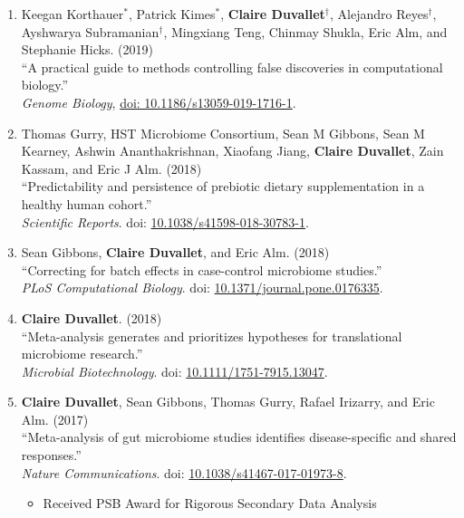 \documentclass[10pt]{article}
\makeatletter
\newlength{\bibhang}
\newlength{\bibsep}
 {\@listi \global\bibsep\itemsep \global\advance\bibsep by\parsep}
\newenvironment{bibsection}%
        {\begin{enumerate}{}{%
       \setlength{\leftmargin}{\bibhang}%
       \setlength{\itemindent}{-\leftmargin}%
       \setlength{\itemsep}{\bibsep}%
       \setlength{\parsep}{\z@}%
        \setlength{\partopsep}{0pt}%
        \setlength{\topsep}{0pt}}}
        {\end{enumerate}\vspace{-.6\baselineskip}}
\makeatother
\begin{document}
\begin{bibsection}
	\item Keegan Korthauer$^{*}$, Patrick Kimes$^{*}$, \textbf{Claire Duvallet}$^{\dagger}$,  Alejandro Reyes$^{\dagger}$,  Ayshwarya Subramanian$^{\dagger}$, Mingxiang Teng, Chinmay Shukla, Eric Alm, and Stephanie Hicks. (2019) \\
		``A practical guide to methods controlling false discoveries in computational biology.''  \\
		\textit{Genome Biology}, \href{https://doi.org/10.1186/s13059-019-1716-1}{doi: 10.1186/s13059-019-1716-1}.
		
	\item Thomas Gurry, HST Microbiome Consortium, Sean M Gibbons, Sean M Kearney, Ashwin Ananthakrishnan, Xiaofang Jiang, \textbf{Claire Duvallet}, Zain Kassam, and Eric J Alm. (2018) \\ 
		``Predictability and persistence of prebiotic dietary supplementation in a healthy human cohort.''  \\ 
		\emph{Scientific Reports}. doi: \href{https://doi.org/10.1038/s41598-018-30783-1}{10.1038/s41598-018-30783-1}.

	\item Sean Gibbons, \textbf{Claire Duvallet}, and Eric Alm.  (2018) \\ 
		``Correcting for batch effects in case-control microbiome studies.''  \\ 
		\emph{PLoS Computational Biology}. doi: \href{https://doi.org/10.1371/journal.pcbi.1006102}{10.1371/journal.pone.0176335}.
		
	\item \textbf{Claire Duvallet}. (2018) \\ 
		``Meta-analysis generates and prioritizes hypotheses for translational microbiome research.'' \\ 
		\emph{Microbial Biotechnology}. doi: \href{https://doi.org/10.1111/1751-7915.13047}{10.1111/1751-7915.13047}.
		
	\item \textbf{Claire Duvallet}, Sean Gibbons, Thomas Gurry, Rafael  Irizarry, and Eric Alm. (2017) \\ 
		``Meta-analysis of gut microbiome studies identifies disease-specific and shared responses.'' \\ 
		\emph{Nature Communications}. doi: \href{https://doi.org/10.1038/s41467-017-01973-8}{10.1038/s41467-017-01973-8}.
		
		\begin{itemize}
			\item Received PSB Award for Rigorous Secondary Data Analysis 
		\end{itemize}		
				

\end{bibsection}
\end{document}
